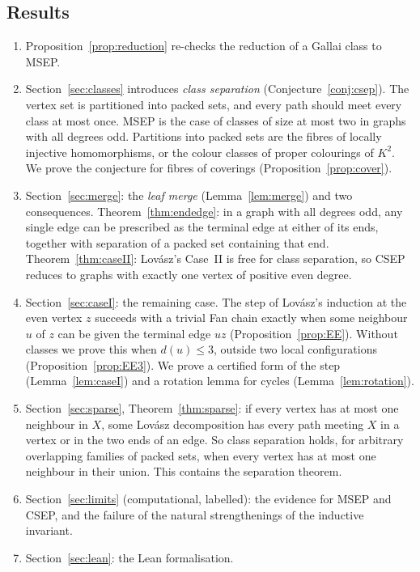 \documentclass[11pt]{amsart}
\theoremstyle{definition}
\begin{document}
\subsection*{Results}
\begin{enumerate}
\item Proposition~\ref{prop:reduction} re-checks the reduction of a Gallai class to MSEP.
\item Section~\ref{sec:classes} introduces \emph{class separation} (Conjecture~\ref{conj:csep}). The
vertex set is partitioned into packed sets, and every path should meet every class at most once. MSEP is
the case of classes of size at most two in graphs with all degrees odd. Partitions into packed sets are the fibres of locally
injective homomorphisms, or the colour classes of proper colourings of $K^2$. We prove the conjecture
for fibres of coverings (Proposition~\ref{prop:cover}).
\item Section~\ref{sec:merge}: the \emph{leaf merge} (Lemma~\ref{lem:merge}) and two consequences.
Theorem~\ref{thm:endedge}: in a graph with all degrees odd, any single edge can be prescribed as the
terminal edge at either of its ends, together with separation of a packed set containing that end. Theorem~\ref{thm:caseII}:
Lov\'asz's Case~II is free for class separation, so CSEP reduces to graphs with exactly one vertex of
positive even degree.
\item Section~\ref{sec:caseI}: the remaining case. The step of Lov\'asz's induction at the even vertex
$z$ succeeds with a trivial Fan chain exactly when some neighbour $u$ of $z$ can be given the terminal
edge $uz$ (Proposition~\ref{prop:EE}). Without classes we prove this when $d(u)\le3$, outside two local
configurations (Proposition~\ref{prop:EE3}). We prove a certified form of the step (Lemma~\ref{lem:caseI})
and a rotation lemma for cycles (Lemma~\ref{lem:rotation}).
\item Section~\ref{sec:sparse}, Theorem~\ref{thm:sparse}: if every vertex has at most one neighbour in
$X$, some Lov\'asz decomposition has every path meeting $X$ in a vertex or in the two ends of an edge.
So class separation holds, for arbitrary overlapping families of packed sets, when every vertex has at
most one neighbour in their union. This contains the separation theorem.
\item Section~\ref{sec:limits} (computational, labelled): the evidence for MSEP and CSEP, and the
failure of the natural strengthenings of the inductive invariant.
\item Section~\ref{sec:lean}: the Lean formalisation.
\end{enumerate}
\end{document}
